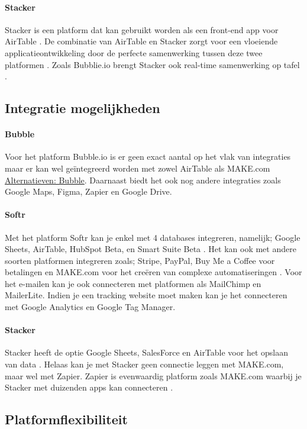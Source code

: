 \paragraph{Stacker}
Stacker is een platform dat kan gebruikt worden als een front-end app voor AirTable \autocite{Advice}. 
De combinatie van AirTable en Stacker zorgt voor een vloeiende applicatieontwikkeling door de perfecte samenwerking tussen deze twee platformen \autocite{Advice}. 
Zoals Bubblie.io brengt Stacker ook real-time samenwerking op tafel \autocite{Allen2020}.
\subsection{Integratie mogelijkheden}%
\label{subsec:integratie-mogelijkheden}
\paragraph{Bubble}
Voor het platform Bubble.io is er geen exact aantal op het vlak van integraties maar er kan wel geïntegreerd worden met zowel AirTable als MAKE.com \hyperref[subsec:bubble]{Alternatieven: Bubble}. 
Daarnaast biedt het ook nog andere integraties zoals Google Maps, Figma, Zapier en Google Drive.
\paragraph{Softr}
Met het platform Softr kan je enkel met 4 databases integreren, namelijk; Google Sheets, AirTable, HubSpot Beta, en Smart Suite Beta \autocite{Frater2024}. 
Het kan ook met andere soorten platformen integreren zoals; Stripe, PayPal, Buy Me a Coffee voor betalingen en MAKE.com voor het creëren van complexe automatiseringen \autocite{Code2023} \autocite{Youssef2023}. 
Voor het e-mailen kan je ook connecteren met platformen als MailChimp en MailerLite. Indien je een tracking website moet maken kan je het connecteren met Google Analytics en Google Tag Manager.
\paragraph{Stacker}
Stacker heeft de optie Google Sheets, SalesForce en AirTable voor het opslaan van data \autocite{Englert2021} \autocite{JDN2023} \autocite{Youssef2023}. 
Helaas kan je met Stacker geen connectie leggen met MAKE.com, maar wel met Zapier. 
Zapier is evenwaardig platform zoals MAKE.com waarbij je Stacker met duizenden apps kan connecteren \autocite{Zapier}.
\subsection{Platformflexibiliteit}%
\label{subsec:platformflexibiliteit}

